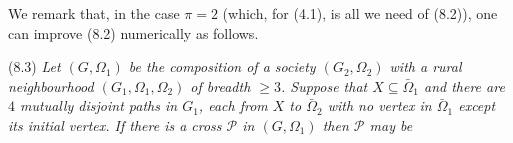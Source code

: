 We remark that, in the case $\pi = 2$ (which, for (4.1), is all we need of (8.2)), one can improve (8.2) numerically as follows.

\stmt
(8.3) \textit{Let $(G, \Omega_1)$ be the composition of a society $(G_2, \Omega_2)$ with a rural neighbourhood $(G_1, \Omega_1, \Omega_2)$ of breadth $\ge 3$. Suppose that $X \subseteq \bar{\Omega}_1$ and there are $4$ mutually disjoint paths in $G_1$, each from $X$ to $\bar{\Omega}_2$ with no vertex in $\bar{\Omega}_1$ except its initial vertex. If there is a cross $\mathscr{P}$ in $(G, \Omega_1)$ then $\mathscr{P}$ may be}
